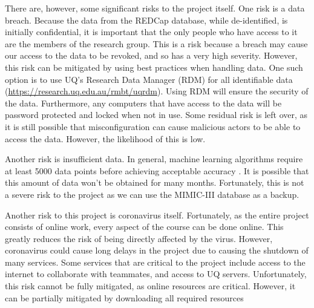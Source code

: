 \documentclass[12pt]{article}
\begin{document}
There are, however, some significant risks to the project itself. One risk is a data breach. Because the data from the REDCap database, while de-identified, is initially confidential, it is important that the only people who have access to it are the members of the research group. This is a risk because a breach may cause our access to the data to be revoked, and so has a very high severity. However, this risk can be mitigated by using best practices when handling data. One such option is to use UQ's Research Data Manager (RDM) for all identifiable data (\url{https://research.uq.edu.au/rmbt/uqrdm}). Using RDM will ensure the security of the data. Furthermore, any computers that have access to the data will be password protected and locked when not in use. Some residual risk is left over, as it is still possible that misconfiguration can cause malicious actors to be able to access the data. However, the likelihood of this is low. 

Another risk is insufficient data. In general, machine learning algorithms require at least 5000 data points before achieving acceptable accuracy \cite{5000Points}. It is possible that this amount of data won't be obtained for many months. Fortunately, this is not a severe risk to the project as we can use the MIMIC-III database as a backup. 

Another risk to this project is coronavirus itself. Fortunately, as the entire project consists of online work, every aspect of the course can be done online. This greatly reduces the risk of being directly affected by the virus. However, coronavirus could cause long delays in the project due to causing the shutdown of many services. Some services that are critical to the project include access to the internet to collaborate with teammates, and access to UQ servers. Unfortunately, this risk cannot be fully mitigated, as online resources are critical. However, it can be partially mitigated by downloading all required resources

\cite{APACHE}
\cite{APACHE2}
\cite{IsAttentionInterpretable}

\end{document}
